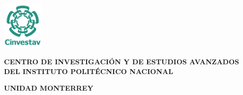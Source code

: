 %


\begin{titlepage}
	\tgherosfont
	\centering
	
	\noindent
	\begin{minipage}[h]{0.05\textwidth}
		\hspace{-2cm} %
		\includegraphics[width=2cm]{gfx/logospng1.png}
	\end{minipage}%
	\begin{minipage}[h]{0.95\textwidth}
		\centering
		\large 
		\textbf{CENTRO DE INVESTIGACIÓN Y DE ESTUDIOS AVANZADOS DEL INSTITUTO POLITÉCNICO NACIONAL}
	\end{minipage}


	{\large \textbf{UNIDAD MONTERREY}} \\[15mm]
	



\end{titlepage}
